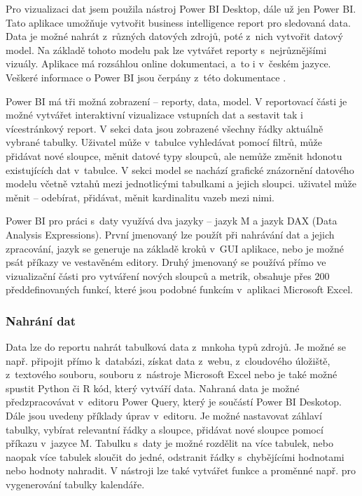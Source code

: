 Pro vizualizaci dat jsem použila nástroj Power BI Desktop, dále už jen Power BI. Tato aplikace umožňuje vytvořit business intelligence report pro sledovaná data. Data je možné nahrát z~různých datových zdrojů, poté z~nich vytvořit datový model. Na základě tohoto modelu pak lze vytvářet reporty s~nejrůznějšími vizuály. Aplikace má rozsáhlou online dokumentaci, a~to i v~českém jazyce. Veškeré informace o Power BI jsou čerpány z~této dokumentace \cite{bib:PBI}. 

Power BI má tři možná zobrazení -- reporty, data, model. V reportovací části je možné vytvářet interaktivní vizualizace vstupních dat a sestavit tak i vícestránkový report. V sekci data jsou zobrazené všechny řádky aktuálně vybrané tabulky. Uživatel může v~tabulce vyhledávat pomocí filtrů, může přidávat nové sloupce, měnit datové typy sloupců, ale nemůže změnit hdonotu existujících dat v~tabulce. V sekci model se nachází grafické znázornění datového modelu včetně vztahů mezi jednotlicými tabulkami a jejich sloupci. uživatel může měnit -- odebírat, přidávat, měnit kardinalitu vazeb mezi nimi.

Power BI pro práci s~daty využívá dva jazyky -- jazyk M a jazyk DAX (Data Analysis Expressions). První jmenovaný lze použít při nahrávání dat a jejich zpracování, jazyk se generuje na základě kroků v~GUI aplikace, nebo je možné psát příkazy ve vestavěném editory. Druhý jmenovaný se používá přímo ve vizualizační části pro vytváření nových sloupců a metrik, obsahuje přes 200 předdefinovaných funkcí, které jsou podobné funkcím v~aplikaci Microsoft Excel.

\subsubsection*{Nahrání dat}

Data lze do reportu nahrát tabulková data z~mnkoha typů zdrojů. Je možné se např. připojit přímo k~databázi, získat data z~webu, z~cloudového úložiště, z~textového souboru, souboru z~nástroje Microsoft Excel nebo je také možné spustit Python či R kód, který vytváří data. Nahraná data je možné předzpracovávat v~editoru Power Query, který je součástí Power BI Deskotop. Dále jsou uvedeny příklady úprav v~editoru. Je možné nastavovat záhlaví tabulky, vybírat relevantní řádky a sloupce, přidávat nové sloupce pomocí příkazu v~jazyce M. Tabulku s~daty je možné rozdělit na více tabulek, nebo naopak více tabulek sloučit do jedné, odstranit řádky s~chybějícími hodnotami nebo hodnoty nahradit. V nástroji lze také vytvářet funkce a proměnné např. pro vygenerování tabulky kalendáře.

